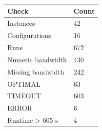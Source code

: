 \begin{tabular}{ll}
\hline
Check & Count \\
\hline
Instances & 42 \\
Configurations & 16 \\
Runs & 672 \\
Numeric bandwidth & 430 \\
Missing bandwidth & 242 \\
OPTIMAL & 63 \\
TIMEOUT & 603 \\
ERROR & 6 \\
Runtime > 605 s & 4 \\
\hline
\end{tabular}

